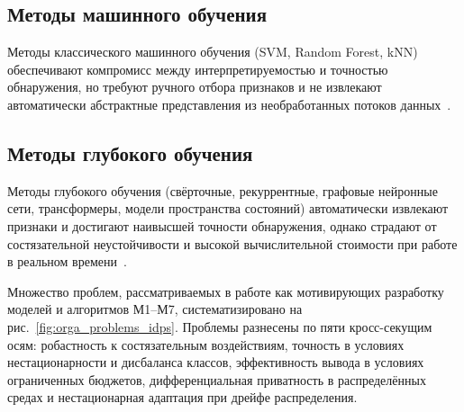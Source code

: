 \subsection{Методы машинного обучения}

Методы классического машинного обучения (SVM, Random Forest, kNN)
обеспечивают компромисс между интерпретируемостью и точностью
обнаружения, но требуют ручного отбора признаков и не извлекают
автоматически абстрактные представления из необработанных потоков
данных~\cite{Buczak2016}.

\subsection{Методы глубокого обучения}

Методы глубокого обучения (свёрточные, рекуррентные, графовые нейронные
сети, трансформеры, модели пространства состояний) автоматически
извлекают признаки и достигают наивысшей точности обнаружения, однако
страдают от состязательной неустойчивости и высокой вычислительной
стоимости при работе в реальном времени~\cite{Ahmad2021,Ferrag2020}.

\label{sec:idps_problems}%

Множество проблем, рассматриваемых в работе как мотивирующих
разработку моделей и алгоритмов М1--М7, систематизировано на
рис.~\ref{fig:orga_problems_idps}. Проблемы разнесены по пяти
кросс-секущим осям: робастность к состязательным воздействиям,
точность в условиях нестационарности и дисбаланса классов,
эффективность вывода в условиях ограниченных бюджетов,
дифференциальная приватность в распределённых средах и нестационарная
адаптация при дрейфе распределения.

